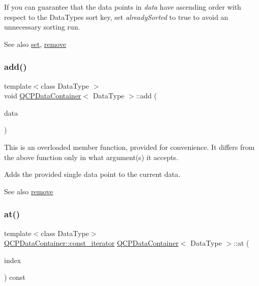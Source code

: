 If you can guarantee that the data points in {\itshape data} have ascending order with respect to the Data\+Type\textquotesingle{}s sort key, set {\itshape already\+Sorted} to true to avoid an unnecessary sorting run.

\begin{DoxySeeAlso}{See also}
\hyperlink{class_q_c_p_data_container_ae7042bd534fc3ce7befa2ce3f790b5bf}{set}, \hyperlink{class_q_c_p_data_container_ae5f569a120648b167efa78835f12fd38}{remove} 
\end{DoxySeeAlso}
\mbox{\label{class_q_c_p_data_container_a715e8e9972466804954a2f8fbd5288b7}} 
\subsubsection{\texorpdfstring{add()}{add()}\hspace{0.1cm}{\footnotesize\ttfamily [3/3]}}
{\footnotesize\ttfamily template$<$class Data\+Type $>$ \\
void \hyperlink{class_q_c_p_data_container}{Q\+C\+P\+Data\+Container}$<$ Data\+Type $>$\+::add (\begin{DoxyParamCaption}\item[{const Data\+Type \&}]{data }\end{DoxyParamCaption})}

This is an overloaded member function, provided for convenience. It differs from the above function only in what argument(s) it accepts.

Adds the provided single data point to the current data.

\begin{DoxySeeAlso}{See also}
\hyperlink{class_q_c_p_data_container_ae5f569a120648b167efa78835f12fd38}{remove} 
\end{DoxySeeAlso}
\mbox{\label{class_q_c_p_data_container_ae90c7457a052b223539906e6bddc0a92}} 
\subsubsection{\texorpdfstring{at()}{at()}}
{\footnotesize\ttfamily template$<$class Data\+Type$>$ \\
\hyperlink{class_q_c_p_data_container_ae40a91f5cb0bcac61d727427449b7d15}{Q\+C\+P\+Data\+Container\+::const\+\_\+iterator} \hyperlink{class_q_c_p_data_container}{Q\+C\+P\+Data\+Container}$<$ Data\+Type $>$\+::at (\begin{DoxyParamCaption}\item[{int}]{index }\end{DoxyParamCaption}) const\hspace{0.3cm}{\ttfamily [inline]}}

